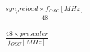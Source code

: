 \documentclass{article}
\begin{document}
$\frac{syn_preload \times f_{OSC}[MHz]}{48}$
\pagebreak

$\frac{48 \times prescaler}{f_{OSC}[MHz]}$
\pagebreak
\end{document}
